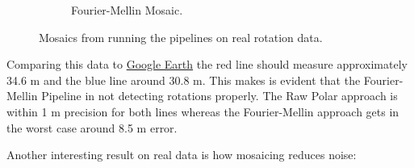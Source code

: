 \begin{figure}[H]
\begin{subfigure}[b]{0.47\textwidth}
        \caption{Fourier-Mellin Mosaic.}
    \end{subfigure}
    \label{fig:sonar-mosaic}
    \caption{Mosaics from running the pipelines on real rotation data.}
\end{figure}


Comparing this data to \href{https://earth.google.com/web/@63.44140267,10.4184834,0.19057254a,140.41066178d,35y,125.00002682h,0t,0r/data=OgMKATA}{Google Earth} the red line should measure approximately 34.6 m and the blue line around 30.8 m. This makes is evident that the Fourier-Mellin Pipeline in not detecting rotations properly. The Raw Polar approach is within 1 m precision for both lines whereas the Fourier-Mellin approach gets in the worst case around 8.5 m error. 


Another interesting result on real data is how mosaicing reduces noise:


